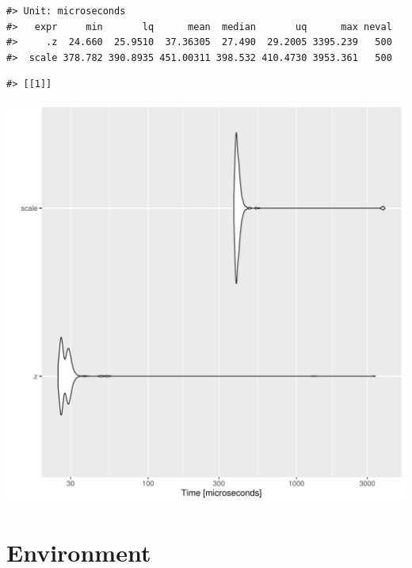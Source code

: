 \documentclass{article}\usepackage[]{graphicx}\usepackage[]{color}
\makeatletter
\newenvironment{kframe}{%
 \def\at@end@of@kframe{}%
 \ifinner\ifhmode%
  \def\at@end@of@kframe{\end{minipage}}%
  \begin{minipage}{\columnwidth}%
 \fi\fi%
 \def\FrameCommand##1{\hskip\@totalleftmargin \hskip-\fboxsep
 \colorbox{shadecolor}{##1}\hskip-\fboxsep
     \hskip-\linewidth \hskip-\@totalleftmargin \hskip\columnwidth}%
 \MakeFramed {\advance\hsize-\width
   \@totalleftmargin\z@ \linewidth\hsize
   \@setminipage}}%
 {\par\unskip\endMakeFramed%
 \at@end@of@kframe}
\newenvironment{knitrout}{}{} %
\makeatother
\begin{document}
\begin{knitrout}
\color{fgcolor}\begin{kframe}
\begin{verbatim}
#> Unit: microseconds
#>   expr     min       lq      mean  median       uq      max neval
#>     .z  24.660  25.9510  37.36305  27.490  29.2005 3395.239   500
#>  scale 378.782 390.8935 451.00311 398.532 410.4730 3953.361   500
\end{verbatim}


{\ttfamily\noindent\itshape\color{messagecolor}{\#> Coordinate system already present. Adding new coordinate system, which will replace the existing one.}}\begin{verbatim}
#> [[1]]
\end{verbatim}
\end{kframe}
\includegraphics[width=1\linewidth]{man/figures/latex-test-benchmark-linearAlgebra-z-dot-1} 

\end{knitrout}

\newpage 

\section*{Environment}
\end{document}
